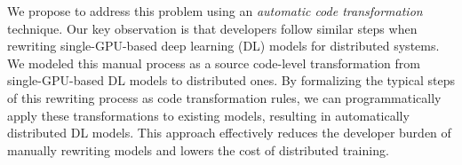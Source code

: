 



We propose to address this problem using an {\it automatic code transformation}
technique. 
Our key observation is that developers follow similar steps when rewriting
single-GPU-based deep learning (DL) models for distributed systems.
We modeled this manual process as a source code-level transformation from
single-GPU-based DL models to distributed ones. 
By formalizing the typical steps of this rewriting process as code
transformation rules, we can programmatically apply these transformations to
existing models, resulting in automatically distributed DL models. 
This approach effectively reduces the developer burden of manually rewriting
models and lowers the cost of distributed training.


